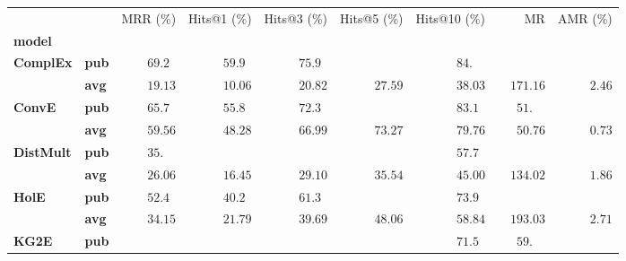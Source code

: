 \begin{tabular}{llrrrrrrr}
\toprule
       &     &           MRR (\%) &        Hits@1 (\%) &        Hits@3 (\%) &        Hits@5 (\%) &       Hits@10 (\%) &                              MR &            AMR (\%) \\
\textbf{model} & {} &                    &                    &                    &                    &                    &                                 &                     \\
\midrule
\textbf{ComplEx} & \textbf{pub} &  $69.2\phantom{0}$ &  $59.9\phantom{0}$ &  $75.9\phantom{0}$ &                    &  $84.\phantom{00}$ &                                 &                     \\
       & \textbf{avg} &            $19.13$ &            $10.06$ &            $20.82$ &            $27.59$ &            $38.03$ &            $\phantom{00}171.16$ &  $\phantom{00}2.46$ \\\midrule
\textbf{ConvE} & \textbf{pub} &  $65.7\phantom{0}$ &  $55.8\phantom{0}$ &  $72.3\phantom{0}$ &                    &  $83.1\phantom{0}$ &  $\phantom{000}51.\phantom{00}$ &                     \\
       & \textbf{avg} &            $59.56$ &            $48.28$ &            $66.99$ &            $73.27$ &            $79.76$ &            $\phantom{000}50.76$ &  $\phantom{00}0.73$ \\\midrule
\textbf{DistMult} & \textbf{pub} &  $35.\phantom{00}$ &                    &                    &                    &  $57.7\phantom{0}$ &                                 &                     \\
       & \textbf{avg} &            $26.06$ &            $16.45$ &            $29.10$ &            $35.54$ &            $45.00$ &            $\phantom{00}134.02$ &  $\phantom{00}1.86$ \\\midrule
\textbf{HolE} & \textbf{pub} &  $52.4\phantom{0}$ &  $40.2\phantom{0}$ &  $61.3\phantom{0}$ &                    &  $73.9\phantom{0}$ &                                 &                     \\
       & \textbf{avg} &            $34.15$ &            $21.79$ &            $39.69$ &            $48.06$ &            $58.84$ &            $\phantom{00}193.03$ &  $\phantom{00}2.71$ \\\midrule
\textbf{KG2E} & \textbf{pub} &                    &                    &                    &                    &  $71.5\phantom{0}$ &  $\phantom{000}59.\phantom{00}$ &                     \\

\end{tabular}
